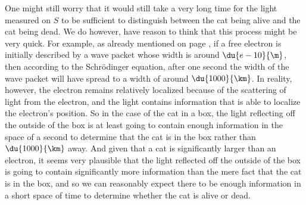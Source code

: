 \documentclass[12pt]{report}
\begin{document}
One might still worry that it would still take a very long time for the light measured on $S$ to be sufficient to distinguish between the cat being alive and the cat being dead. We do however, have reason to think that this process might be very quick. For example, as already mentioned on page \pageref{electronspread},  if a free electron is initially described by a wave packet whose width is around $\du{e-10}{\m}$, then according to the Schr\"{o}dinger equation, after one second the width of the wave packet will have spread to a width of around $\du{1000}{\km}$. In reality, however, the electron remains relatively localized because of the scattering of light from the electron, and the light contains information that is able to localize the electron's position. So in the case of the cat in a box, the light reflecting off the outside of the box is at least going to contain enough information in the space of a second to determine that the cat is in the box rather than $\du{1000}{\km}$ away. And given that a cat is significantly larger than an electron, it seems very plausible that the light reflected off the outside of the box is going to contain significantly more information than the mere fact that the cat is in the box, and so we can reasonably expect there to be enough information in a short space of time to determine whether the cat is alive or dead.
    
\end{document}
